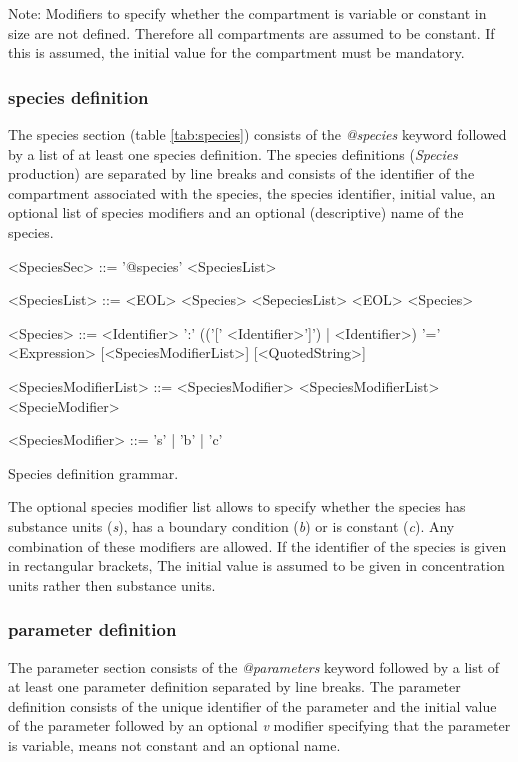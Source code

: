 \documentclass[a4paper]{article}
\begin{document}
Note: Modifiers to specify whether the compartment is variable or constant in size are not defined. Therefore all compartments are assumed to be constant. If this is assumed, the initial value for the compartment must be mandatory.


\subsubsection*{species definition}
The species section (table \ref{tab:species}) consists of the \emph{@species} keyword followed by a list of at least one species definition. The species definitions (\emph{Species} production) are separated by line breaks and consists of the identifier of the compartment associated with the species, the species identifier, initial value, an optional list of species modifiers and an optional (descriptive) name of the species.

\begin{table}[h!]
\begin{grammar}
<SpeciesSec> ::= '@species' <SpeciesList>

<SpeciesList> ::= <EOL> <Species> <SepeciesList> 
 \alt <EOL> <Species> 
 
<Species> ::= <Identifier> ':' (('[' <Identifier>']') | <Identifier>) '=' <Expression> [<SpeciesModifierList>] [<QuotedString>]

<SpeciesModifierList> ::= <SpeciesModifier> <SpeciesModifierList>
  \alt <SpecieModifier>
  
<SpeciesModifier> ::= 's' | 'b' | 'c'
\end{grammar}
\caption{Species definition grammar.} \label{tab:species}
\end{table}

The optional species modifier list allows to specify whether the species has substance units (\emph{s}), has a boundary condition (\emph{b}) or is constant (\emph{c}). Any combination of these modifiers are allowed. If the identifier of the species is given in rectangular brackets, The initial value is assumed to be given in concentration units rather then substance units.


\subsubsection*{parameter definition}
The parameter section consists of the \emph{@parameters} keyword followed by a list of at least one parameter definition separated by line breaks. The parameter definition consists of the unique identifier of the parameter and the initial value of the parameter followed by an optional \emph{v} modifier specifying that the parameter is variable, means not constant and an optional name.
\end{document}
